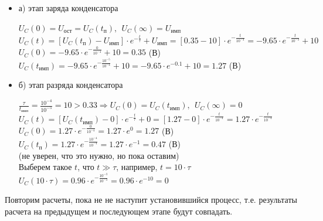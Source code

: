 	\begin{itemize}
\item[] а) этап заряда конденсатора

		$U_C(0) = U_\text{ост} = U_C(t_\text{п}),\ \ U_C(\infty) = U_\text{имп}$\\
		$U_C(t) = [U_C(t_\text{п}) - U_\text{имп}] \cdot e^{-\frac{t}{\tau}} + U_\text{имп} = [0.35 - 10] \cdot e^{-\frac{t}{10^{-4}}} = -9.65 \cdot e^{-\frac{t}{10^{-4}}} + 10$\\
		$U_C(0) = -9.65 \cdot e^{-\frac{0}{10^{-4}}} + 10 = 0.35$ (В)\\
		$U_C(t_\text{имп}) = -9.65 \cdot e^{-\frac{10^{-5}}{10^{-4}}} + 10 = -9.65 \cdot e^{-0.1} + 10 = 1.27$ (В)\\
		
\item[] б) этап разряда конденсатора
	
		$\frac{\tau}{t_\text{имп}} = \frac{10^{-4}}{10^{-5}} = 10 > 0.33 \Rightarrow U_C(0) = U_C(t_\text{имп}),\ \ U_C(\infty) = 0$\\
		$U_C(t) = [U_C(t_\text{имп}) - 0] \cdot e^{-\frac{t}{\tau}} + 0 =  [1.27 - 0] \cdot e^{-\frac{t}{10^{-4}}} = 1.27 \cdot e^{-\frac{t}{10^{-4}}}$\\
		$U_C(0) = 1.27 \cdot e^{-\frac{0}{10^{-4}}} = 1.27 \cdot e^0 = 1.27$ (В)\\
		$U_C(t_\text{п}) = 1.27 \cdot e^{-\frac{10^{-4}}{10^{-4}}} = 1.27 \cdot e^{-1} = 0.47$ (В)\\
		(не уверен, что это нужно, но пока оставим)\\
		Выберем такое $t$, что $t \gg \tau$, например, $t = 10 \cdot \tau$ \\
		$U_C( 10 \cdot \tau) = 0.96 \cdot e^{-\frac{10^{-3}}{10^{-4}}} = 0.96 \cdot e^{-10} = 0$	
		
\end{itemize}	

	Повторим расчеты, пока не не наступит установившийся процесс, т.е. результаты расчета на предыдущем и последующем этапе будут совпадать.	
	
